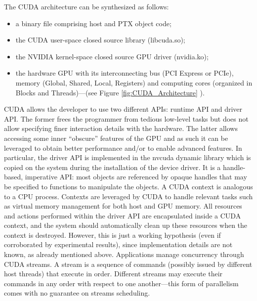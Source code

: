 \documentclass[11pt,onecolumn,letterpaper]{IEEEtran}
\begin{document}
The CUDA architecture can be synthesized  as follows:
\begin{itemize}
 \item a binary file comprising host and PTX \cite{cudadevguide} object code;
 \item the CUDA user-space closed source library (libcuda.so);
 \item the NVIDIA kernel-space closed source GPU driver (nvidia.ko);
 \item the hardware GPU with its interconnecting bus (PCI Express or PCIe),
 memory (Global, Shared, Local, Registers) and computing cores (organized in Blocks and Threads)---(see Figure \ref{fig:CUDA_Architecture} \cite{cudacs}).
\end{itemize}


CUDA allows the developer to use two different APIs: runtime API and driver API.
The former frees the programmer from tedious low-level tasks but does not allow specifying finer interaction details with the hardware.
The latter allows accessing some inner ``obscure'' features of the GPU and as such it can be leveraged to obtain better performance
and/or to enable advanced features.
In particular, the driver API is implemented in the nvcuda dynamic library which is copied on the system during the installation of the device driver.
It is a handle-based, imperative API: most objects are referenced by opaque handles that may be specified to functions to manipulate the objects.
A CUDA context is analogous to a CPU process.
Contexts are leveraged by CUDA to handle relevant tasks such as virtual memory management for both host and GPU memory.
All resources and actions performed within the driver API are encapsulated inside a CUDA context,
and the system should automatically clean up these resources when the context is destroyed.
However, this is just a working hypothesis (even if corroborated by experimental results), since implementation details are not known, as already mentioned above.
Applications manage concurrency through CUDA streams.
A stream is a sequence of commands (possibly issued by different host threads) that execute in order.
Different streams may execute their commands in any order with respect to one another---this form of parallelism comes with no guarantee on streams scheduling. 
\end{document}
